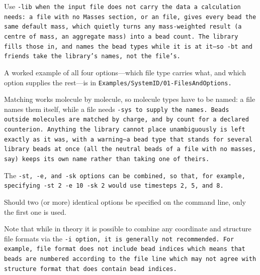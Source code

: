 Use \tt{-lib} when the input file does not carry the data a calculation needs:
a \data file with no \tt{Masses} section, or an \xyz file, gives every bead the
same default mass, which quietly turns any mass-weighted result (a centre of
mass, an aggregate mass) into a bead count. The library fills those in, and
names the bead types while it is at it---so \tt{-bt} and friends take the
library's names, not the file's.

A worked example of all four options---which file type carries what, and which
option supplies the rest---is in \tt{Examples/SystemID/01-FilesAndOptions}.

Matching works molecule by molecule, so molecule types have to be named: a
\vtf file names them itself, while a \data file needs \tt{-sys} to supply the
names. Beads outside molecules are matched by charge, and by count for a
declared counterion. Anything the library cannot place unambiguously is left
exactly as it was, with a warning---a bead type that stands for several library
beads at once (all the neutral beads of a \data file with no masses, say) keeps
its own name rather than taking one of theirs.

The \tt{-st}, \tt{-e}, and \tt{-sk} options can be combined, so that, for
example, specifying \tt{-st 2 -e 10 -sk 2} would use timesteps 2, 5, and 8.

Should two (or more) identical options be specified on the command line, only
the first one is used.

Note that while in theory it is possible to combine any coordinate and structure
file formats via the \tt{-i} option, it is generally not recommended. For
example, \xyz file format does not include bead indices which means that beads
are numbered according to the file line which may not agree with \vsf structure
format that does contain bead indices.







% 
% 

% 
% 
% 
% 
% 
% 
% 

% 

% 
% 
% 
% 


% 


% 
% 
% 
